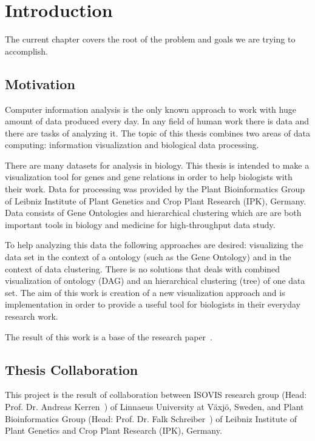 \section{Introduction}
\label{sec:introduction}

The current chapter covers the root of the problem and goals we are trying to accomplish.

\subsection{Motivation}
\label{sec:motivation}

Computer information analysis is the only known approach to work with huge amount of data produced every day. In any field of human work there is data and there are tasks of analyzing it. The topic of this thesis combines two areas of data computing: information visualization and biological data processing.

There are many datasets for analysis in biology. This thesis is intended to make a visualization tool for genes and gene relations in order to help biologists with their work. Data for processing was provided by the Plant Bioinformatics Group of Leibniz Institute of Plant Genetics and Crop Plant Research (IPK), Germany. Data consists of Gene Ontologies and hierarchical clustering which are are both important tools in biology and medicine for high-throughput data study.

To help analyzing this data the following approaches are desired: visualizing the data set in the context of a ontology (such as the Gene Ontology) and in the context of data clustering. There is no solutions that deals with combined visualization of ontology (DAG) and an hierarchical clustering (tree) of one data set. The aim of this work is creation of a new visualization approach and is implementation in order to provide a useful tool for biologists in their everyday research work.

The result of this work is a base of the research paper~\cite{MY_PAPER}.

\subsection{Thesis Collaboration}
This project is the result of collaboration between ISOVIS research group (Head: Prof. Dr. Andreas Kerren~\cite{Kerren}) of Linnaeus University at V\"axj\"o, Sweden, and Plant Bioinformatics Group (Head: Prof. Dr. Falk Schreiber~\cite{Schreiber}) of Leibniz Institute of Plant Genetics and Crop Plant Research (IPK), Germany.


